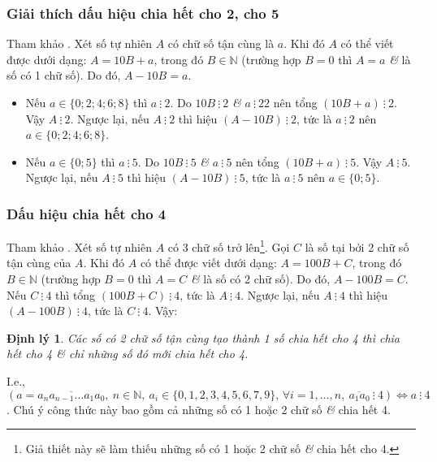 \documentclass{article}
\numberwithin{equation}{section}
\newtheorem{theorem}{Định lý}[section]
\begin{document}
\subsubsection{Giải thích dấu hiệu chia hết cho 2, cho 5}
Tham khảo \cite[p. 37]{Thai_Anh_Dat_Ha_Loan_Nam_Quang_Toan_6_tap_1}. Xét số tự nhiên $A$ có chữ số tận cùng là $a$. Khi đó $A$ có thể viết được dưới dạng: $A = 10B + a$, trong đó $B\in\mathbb{N}$ (trường hợp $B = 0$ thì $A = a$ \textit{\&} là số có 1 chữ số). Do đó, $A - 10 B = a$.
\begin{itemize}
	\item Nếu $a\in\{0;2;4;6;8\}$ thì $a\ \vdots\ 2$. Do $10B\ \vdots\ 2$ \textit{\&} $a\ \vdots\ 2 2$ nên tổng $(10B + a)\ \vdots\ 2$. Vậy $A\ \vdots\ 2$. Ngược lại, nếu $A\ \vdots\ 2$ thì hiệu $(A - 10B)\ \vdots\ 2$, tức là $a\ \vdots\ 2$ nên $a\in\{0;2;4;6;8\}$.
	\item Nếu $a\in\{0;5\}$ thì $a\ \vdots\ 5$. Do $10B\ \vdots\ 5$ \textit{\&} $a\ \vdots\ 5$ nên tổng $(10B + a)\ \vdots\ 5$. Vậy $A\ \vdots\ 5$. Ngược lại, nếu $A\ \vdots\ 5$ thì hiệu $(A - 10B)\ \vdots\ 5$, tức là $a\ \vdots\ 5$ nên $a\in\{0;5\}$.
\end{itemize}

\subsubsection{Dấu hiệu chia hết cho 4}
Tham khảo \cite[p. 37]{Thai_Anh_Dat_Ha_Loan_Nam_Quang_Toan_6_tap_1}. Xét số tự nhiên $A$ có 3 chữ số trở lên\footnote{Giả thiết này sẽ làm thiếu những số có 1 hoặc 2 chữ số \textit{\&} chia hết cho 4.}. Gọi $C$ là số tại bởi 2 chữ số tận cùng của $A$. Khi đó $A$ có thể được viết dưới dạng: $A = 100B + C$, trong đó $B\in\mathbb{N}$ (trường hợp $B = 0$ thì $A = C$ \textit{\&} là số có 2 chữ số). Do đó, $A - 100B = C$. Nếu $C\ \vdots\ 4$ thì tổng $(100B + C)\ \vdots\ 4$, tức là $A\ \vdots\ 4$. Ngược lại, nếu $A\ \vdots\ 4$ thì hiệu $(A - 100B)\ \vdots\ 4$, tức là $C\ \vdots\ 4$. Vậy:

\begin{theorem}
	Các số có 2 chữ số tận cùng tạo thành 1 số chia hết cho 4 thì chia hết cho 4 \textit{\&} chỉ những số đó mới chia hết cho 4.
\end{theorem}
I.e., $(a = \overline{a_na_{n-1}\ldots a_1a_0},\ n\in\mathbb{N},\ a_i\in\{0,1,2,3,4,5,6,7,9\},\,\forall i = 1,\ldots,n,\ \overline{a_1a_0}\ \vdots\ 4)\Leftrightarrow a\ \vdots\ 4$. Chú ý công thức này bao gồm cả những số có 1 hoặc 2 chữ số \textit{\&} chia hết 4.
\end{document}
